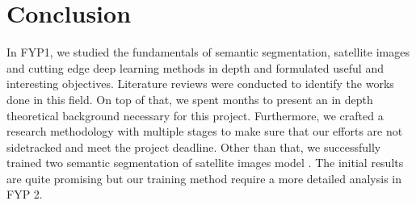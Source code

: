 \section{Conclusion}

In FYP1, we studied the fundamentals of semantic segmentation, satellite images and cutting edge deep learning methods in depth and formulated useful and interesting objectives. Literature reviews were conducted to identify the works done in this field. On top of that, we spent months to present an in depth theoretical background necessary for this project. Furthermore, we crafted a research methodology with multiple stages to make sure that our efforts are not sidetracked and meet the project deadline. Other than that, we successfully trained two semantic segmentation of satellite images model . The initial results are quite promising but our training method require a more detailed analysis in FYP 2.
